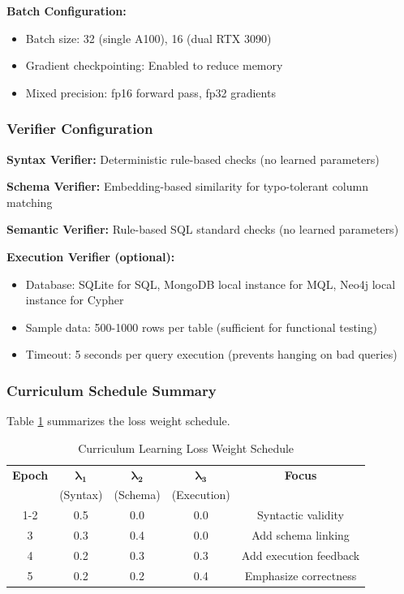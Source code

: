 \documentclass[conference]{IEEEtran}
\begin{document}
\textbf{Batch Configuration:}
\begin{itemize}
\item Batch size: 32 (single A100), 16 (dual RTX 3090)
\item Gradient checkpointing: Enabled to reduce memory
\item Mixed precision: fp16 forward pass, fp32 gradients
\end{itemize}

\subsubsection{Verifier Configuration}

\textbf{Syntax Verifier:} Deterministic rule-based checks (no learned parameters)

\textbf{Schema Verifier:} Embedding-based similarity for typo-tolerant column matching

\textbf{Semantic Verifier:} Rule-based SQL standard checks (no learned parameters)

\textbf{Execution Verifier (optional):}
\begin{itemize}
\item Database: SQLite for SQL, MongoDB local instance for MQL, Neo4j local instance for Cypher
\item Sample data: 500-1000 rows per table (sufficient for functional testing)
\item Timeout: 5 seconds per query execution (prevents hanging on bad queries)
\end{itemize}

\subsubsection{Curriculum Schedule Summary}

Table \ref{tab:curriculum} summarizes the loss weight schedule.

\begin{table}[t]
\caption{Curriculum Learning Loss Weight Schedule}
\begin{center}
\begin{tabular}{|c|c|c|c|c|}
\hline
\textbf{Epoch} & $\boldsymbol{\lambda_1}$ & $\boldsymbol{\lambda_2}$ & $\boldsymbol{\lambda_3}$ & \textbf{Focus} \\
\textbf{} & (Syntax) & (Schema) & (Execution) & \\
\hline
1-2 & 0.5 & 0.0 & 0.0 & Syntactic validity \\
3 & 0.3 & 0.4 & 0.0 & Add schema linking \\
4 & 0.2 & 0.3 & 0.3 & Add execution feedback \\
5 & 0.2 & 0.2 & 0.4 & Emphasize correctness \\
\hline
\end{tabular}
\label{tab:curriculum}
\end{center}
\end{table}
\end{document}

